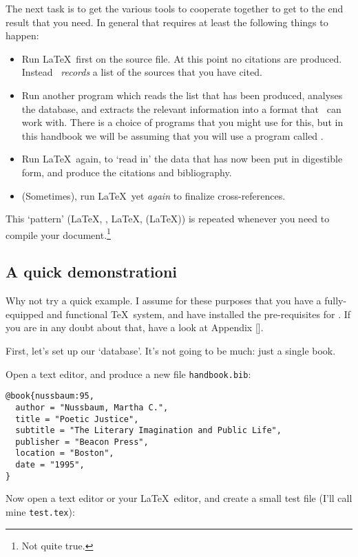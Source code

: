 The next task is to get the various tools to cooperate together to get to the end result that you need. In general that requires at least the following things to happen:
\begin{itemize}
\item Run \LaTeX\ first on the source file. At this point no citations are produced. Instead \biblatex\ \emph{records} a list of the sources that you have cited.
\item Run another program which reads the list that has been produced, analyses the database, and extracts the relevant information into a format that \biblatex\ can work with. There is a choice of programs that you might use for this, but in this handbook we will be assuming that you will use a program called .
\item Run \LaTeX\ again, to `read in' the data that has now been put in digestible form, and produce the citations and bibliography.
\item (Sometimes), run \LaTeX\ yet \emph{again} to finalize cross-references.
\end{itemize}

This `pattern' (\LaTeX, , \LaTeX, (\LaTeX)) is repeated whenever you need to compile your document.\footnote{Not quite true.}

\subsection{A quick demonstrationi\label{neophyte:example}}

Why not try a quick example. I assume for these purposes that you have a fully-equipped and functional \TeX\ system, and have installed the pre-requisites for \biblatex. If you are in any doubt about that, have a look at Appendix [].

First, let's set up our `database'. It's not going to be much: just a single book.

Open a text editor, and produce a new file \texttt{handbook.bib}:
\begin{verbatim}
@book{nussbaum:95,
  author = "Nussbaum, Martha C.",
  title = "Poetic Justice",
  subtitle = "The Literary Imagination and Public Life",
  publisher = "Beacon Press",
  location = "Boston",
  date = "1995",
}
\end{verbatim}

Now open a text editor or your \LaTeX\ editor, and create a small test file (I'll call mine \texttt{test.tex}):

